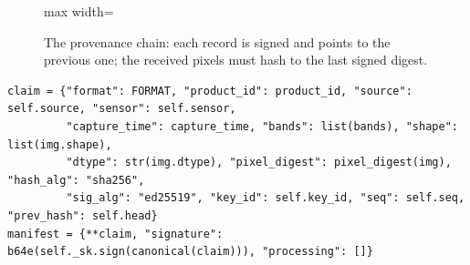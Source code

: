 \begin{figure}[!htbp]
\centering
\begin{adjustbox}{max width=\textwidth}
\end{adjustbox}
\caption{The provenance chain: each record is signed and points to the previous one; the received pixels must hash to the last signed digest.}
\end{figure}

\begin{lstlisting}[style=py]
claim = {"format": FORMAT, "product_id": product_id, "source": self.source, "sensor": self.sensor,
         "capture_time": capture_time, "bands": list(bands), "shape": list(img.shape),
         "dtype": str(img.dtype), "pixel_digest": pixel_digest(img), "hash_alg": "sha256",
         "sig_alg": "ed25519", "key_id": self.key_id, "seq": self.seq, "prev_hash": self.head}
manifest = {**claim, "signature": b64e(self._sk.sign(canonical(claim))), "processing": []}
\end{lstlisting}

